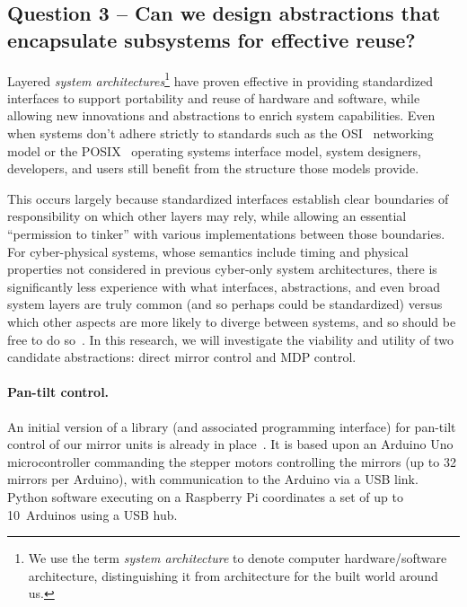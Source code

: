 \subsection{Question 3 -- Can we design abstractions that encapsulate
subsystems for effective reuse?}

Layered \emph{system architectures}\footnote{We use the term
\emph{system architecture}
to denote computer hardware/software architecture, distinguishing it from
architecture for the built world around us.}
have proven effective in providing standardized interfaces to
support portability
and reuse of hardware and software,
while allowing new innovations and abstractions
to enrich system capabilities.
Even when systems don't adhere strictly to standards
such as the OSI~\cite{osi} networking model or the POSIX~\cite{posix} operating
systems interface model, system designers, developers,
and users still benefit
from the structure those models provide.

This occurs largely because standardized interfaces establish clear
boundaries of responsibility on which other layers may rely, while allowing an essential
``permission to tinker'' with various implementations between those
boundaries. For cyber-physical systems, whose semantics include timing
and physical properties not considered in previous cyber-only system
architectures, there is significantly less experience with what interfaces,
abstractions, and even broad system layers are truly common (and so perhaps
could be standardized) versus which other aspects are more likely to
diverge between systems, and so should be free to do so~\cite{cag18}.
In this research, we will investigate the viability and utility of
two candidate abstractions: direct mirror control and MDP control.

\paragraph{Pan-tilt control.}
An initial version of a library (and associated programming interface) 
for pan-tilt control of our mirror units is already in place~\cite{Mitchell18}.
It is based upon an Arduino Uno microcontroller commanding the stepper
motors controlling the mirrors (up to 32 mirrors per Arduino),
with communication to the Arduino
via a USB link.  Python software executing on a Raspberry Pi coordinates
a set of up to 10~Arduinos using a USB hub.

